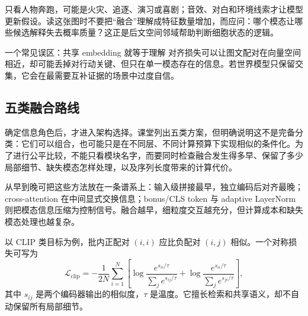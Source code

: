 
只看人物奔跑，可能是火灾、追逐、演习或喜剧；音效、对白和环境线索才让模型更新假设。读这张图时不要把“融合”理解成特征数量增加，而应问：哪个模态让哪些候选解释失去概率质量？这正是后文空间邻域帮助判断细胞状态的逻辑。


\begin{warningbox}{一个常见误区：共享 embedding 就等于理解}
对齐损失可以让图文配对在向量空间相近，却可能丢掉对行动关键、但只在单一模态存在的信息。若世界模型只保留交集，它会在最需要互补证据的场景中过度自信。
\end{warningbox}

\subsection{五类融合路线}

确定信息角色后，才进入架构选择。课堂列出五类方案，但明确说明这不是完备分类：它们可以组合，也可能只是在不同层、不同计算预算下实现相似的条件化。为了进行公平比较，不能只看模块名字，而要同时检查融合发生得多早、保留了多少局部细节、缺失模态怎样处理，以及序列长度带来的计算代价。


从早到晚可把这些方法放在一条谱系上：输入级拼接最早，独立编码后对齐最晚；cross-attention 在中间显式交换信息；bonus/CLS token 与 adaptive LayerNorm 则把模态信息压缩为控制信号。融合越早，细粒度交互越充分，但计算成本和缺失模态处理也越复杂。


以 CLIP 类目标为例，批内正配对 $(i,i)$ 应比负配对 $(i,j)$ 相似。一个对称损失可写为
\[
\mathcal{L}_{\mathrm{clip}}
=-\frac{1}{2N}\sum_{i=1}^{N}\left[
\log\frac{e^{s_{ii}/\tau}}{\sum_j e^{s_{ij}/\tau}}
+\log\frac{e^{s_{ii}/\tau}}{\sum_j e^{s_{ji}/\tau}}
\right],
\]
其中 $s_{ij}$ 是两个编码器输出的相似度，$\tau$ 是温度。它擅长检索和共享语义，却不自动保留所有局部细节。


